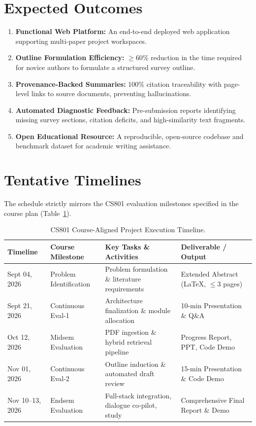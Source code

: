 \documentclass[10pt,a4paper]{article}
\begin{document}
\section{Expected Outcomes}
\begin{enumerate}
    \item \textbf{Functional Web Platform:} An end-to-end deployed web application supporting multi-paper project workspaces.
    \item \textbf{Outline Formulation Efficiency:} $\ge 60\%$ reduction in the time required for novice authors to formulate a structured survey outline.
    \item \textbf{Provenance-Backed Summaries:} 100\% citation traceability with page-level links to source documents, preventing hallucinations.
    \item \textbf{Automated Diagnostic Feedback:} Pre-submission reports identifying missing survey sections, citation deficits, and high-similarity text fragments.
    \item \textbf{Open Educational Resource:} A reproducible, open-source codebase and benchmark dataset for academic writing assistance.
\end{enumerate}

\section{Tentative Timelines}
The schedule strictly mirrors the CS801 evaluation milestones specified in the course plan (Table~\ref{tab:timeline}).

\begin{table}[H]
\centering
\scriptsize
\setlength{\tabcolsep}{3.5pt}
\renewcommand{\arraystretch}{0.95}
\begin{tabularx}{\textwidth}{@{}lllX@{}}
\toprule
\textbf{Timeline} & \textbf{Course Milestone} & \textbf{Key Tasks \& Activities} & \textbf{Deliverable / Output} \\
\midrule
Sept 04, 2026 & Problem Identification & Problem formulation \& literature requirements & Extended Abstract (LaTeX, $\le 3$ pages) \\
Sept 21, 2026 & Continuous Eval-1 & Architecture finalization \& module allocation & 10-min Presentation \& Q\&A \\
Oct 12, 2026 & Midsem Evaluation & PDF ingestion \& hybrid retrieval pipeline & Progress Report, PPT, Code Demo \\
Nov 01, 2026 & Continuous Eval-2 & Outline induction \& automated draft review & 15-min Presentation \& Code Demo \\
Nov 10--13, 2026 & Endsem Evaluation & Full-stack integration, dialogue co-pilot, study & Comprehensive Final Report \& Demo \\
\bottomrule
\end{tabularx}
\vspace{-0.5em}
\caption{CS801 Course-Aligned Project Execution Timeline.}
\label{tab:timeline}
\end{table}
\end{document}
